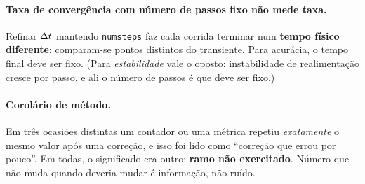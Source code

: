 \paragraph{Taxa de convergência com número de passos fixo não mede taxa.}
Refinar $\Delta t$ mantendo \texttt{numsteps} faz cada corrida terminar num
\textbf{tempo físico diferente}: comparam-se pontos distintos do transiente. Para
acurácia, o tempo final deve ser fixo. (Para \emph{estabilidade} vale o oposto:
instabilidade de realimentação cresce por passo, e ali o número de passos é que
deve ser fixo.)

\paragraph{Corolário de método.} Em três ocasiões distintas um contador ou uma
métrica repetiu \emph{exatamente} o mesmo valor após uma correção, e isso foi
lido como ``correção que errou por pouco''. Em todas, o significado era outro:
\textbf{ramo não exercitado}. Número que não muda quando deveria mudar é
informação, não ruído.
